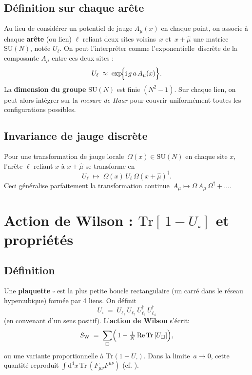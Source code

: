 \subsection*{Définition sur chaque arête}
Au lieu de considérer un potentiel de jauge \(A_\mu(x)\) en chaque point, on associe à chaque \textbf{arête} (ou lien) \(\ell\) reliant deux sites voisins \(\,x\) et \(\,x+\hat{\mu}\) une matrice \(\mathrm{SU}(N)\), notée \(U_\ell\). On peut l’interpréter comme l’\og exponentielle\fg\ discrète de la composante \(A_\mu\) entre ces deux sites :
\[
U_\ell \;\approx\; \exp\!\Bigl\{\mathrm{i}\,g\,a\, A_\mu(x)\Bigr\}.
\]
La \textbf{dimension du groupe} \(\mathrm{SU}(N)\) est finie \((N^2-1)\). Sur chaque lien, on peut alors intégrer sur la \emph{mesure de Haar} pour couvrir uniformément toutes les configurations possibles.

\subsection*{Invariance de jauge discrète}
Pour une transformation de jauge locale \(\,\Omega(x)\in \mathrm{SU}(N)\) en chaque site \(x\), l’arête \(\ell\) reliant \(x\) à \(x+\hat{\mu}\) se transforme en
\[
U_\ell \;\mapsto\; \Omega(x)\,U_\ell\,\Omega(x+\hat{\mu})^\dagger.
\]
Ceci généralise parfaitement la transformation continue \(\,A_\mu \mapsto \Omega\,A_\mu\,\Omega^\dagger + \dots\).

\vspace{1em}

\section{Action de Wilson : \texorpdfstring{\(\mathrm{Tr}[\,1 - U_\square]\)}{Tr(1 - U_sq)} et propriétés}
\label{sec:4.3}

\subsection*{Définition}
Une \textbf{plaquette} \(\square\) est la plus petite boucle rectangulaire (un carré dans le réseau hypercubique) formée par 4 liens. On définit
\[
U_\square \;=\; U_{\ell_1}\,U_{\ell_2}\,U_{\ell_3}^\dagger\,U_{\ell_4}^\dagger
\]
(en convenant d’un sens positif). L’\textbf{action de Wilson} s’écrit:
\[
S_{\mathrm{W}} \;=\; \sum_{\square} \Bigl(\,1 - \tfrac{1}{N}\,\mathrm{Re}\,\mathrm{Tr}\,[U_\square]\Bigr),
\]
ou une variante proportionnelle à \(\mathrm{Tr}(1 - U_\square)\). Dans la limite \(\,a\to 0\), cette quantité reproduit \(\int \mathrm{d}^4 x\, \mathrm{Tr}\,(F_{\mu\nu}F^{\mu\nu})\) (cf. \cite{Wilson1974-1,Creutz1983}).

